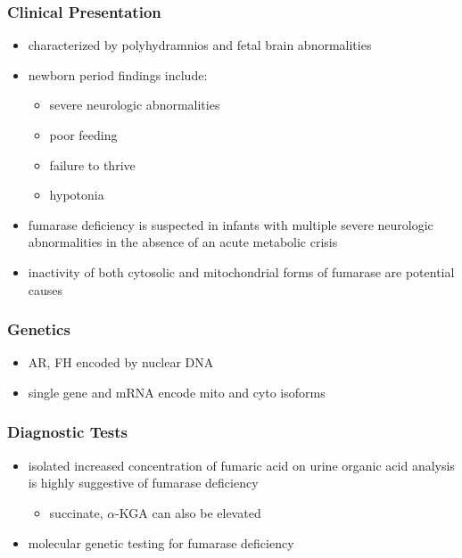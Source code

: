 \documentclass{scrartcl}
\begin{document}
\subsubsection{Clinical Presentation}
\label{sec:org5fa4459}
\begin{itemize}
\item characterized by polyhydramnios and fetal brain abnormalities
\item newborn period findings include:
\begin{itemize}
\item severe neurologic abnormalities
\item poor feeding
\item failure to thrive
\item hypotonia
\end{itemize}
\item fumarase deficiency is suspected in infants with multiple severe
neurologic abnormalities in the absence of an acute metabolic crisis
\item inactivity of both cytosolic and mitochondrial forms of fumarase are
potential causes
\end{itemize}
\subsubsection{Genetics}
\label{sec:orga1b1928}
\begin{itemize}
\item AR, FH encoded by nuclear DNA
\item single gene and mRNA encode mito and cyto isoforms
\end{itemize}
\subsubsection{Diagnostic Tests}
\label{sec:org06fbe7b}
\begin{itemize}
\item isolated increased concentration of fumaric acid on urine organic
acid analysis is highly suggestive of fumarase deficiency
\begin{itemize}
\item succinate, \(\alpha\)-KGA can also be elevated
\end{itemize}
\item molecular genetic testing for fumarase deficiency
\end{itemize}
\end{document}
